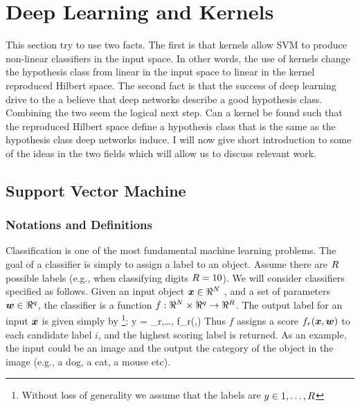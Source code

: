 \section{Deep Learning and Kernels}
This section try to use two facts.
The first is that kernels allow SVM to produce non-linear classifiers in the input space.
In other words, the use of kernels change the hypothesis class from linear in the input space to linear in the kernel reproduced Hilbert space.
The second fact is that the success of deep learning drive to the a believe that deep networks describe a good hypothesis class.
Combining the two seem the logical next step.
Can a kernel be found such that the reproduced Hilbert space define a hypothesis class that is the same as the hypothesis class deep networks induce.
I will now give short introduction to some of the ideas in the two fields which will allow us to discuss relevant work.
\subsection{Support Vector Machine}
\subsubsection{Notations and Definitions}
Classification is one of the most fundamental machine learning problems. The goal of a classifier is simply to assign a label to an object. Assume there are $R$ possible labels (e.g., when classifying digits $R=10$). We will consider classifiers specified as follows. Given an input object $\boldsymbol{x} \in \Re^N$ , and a set of parameters $\boldsymbol{w}\in\Re^q$, the classifier is a function $f: \Re^N \times \Re^q \to \Re^R$. The output label for an input $\boldsymbol{x}$ is given simply by
\footnote{Without loss of generality we assume that the labels are $y \in 1,\ldots,R$}:
\be
y = \arg\max_{r,\ldots, \card} f_r(\xx,\ww)
\label{eq:argmax_classify}
\ee
Thus $f$ assigns a score $f_r(\boldsymbol{x},\boldsymbol{w})$ to each candidate label $i$, and the highest scoring label is returned.
As an example, the input could be an image and the output the category of the object in the image (e.g., a dog, a cat, a mouse etc). 


